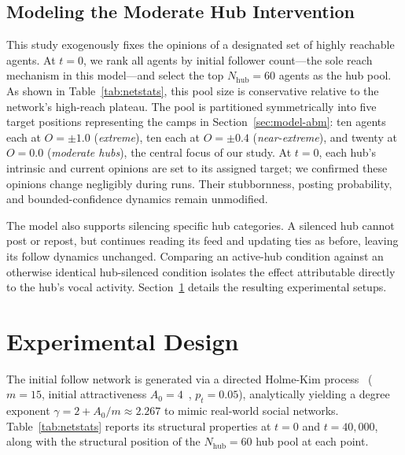 \documentclass{svproc}
\begin{document}
\subsection{Modeling the Moderate Hub Intervention}\label{sec:model-intervention}
This study exogenously fixes the opinions of a designated set of
highly reachable agents. At $t=0$, we rank all agents by initial
follower count—the sole reach mechanism in this model—and select the
top $N_{\mathrm{hub}}=60$ agents as the hub pool. As shown in
Table~\ref{tab:netstats}, this pool size is conservative relative to
the network's high-reach plateau. The pool is partitioned
symmetrically into five target positions representing the camps in
Section~\ref{sec:model-abm}: ten agents each at $O=\pm1.0$
(\emph{extreme}), ten each at $O=\pm0.4$ (\emph{near-extreme}), and
twenty at $O=0.0$ (\emph{moderate hubs}), the central focus of our
study. At $t=0$, each hub's intrinsic and current opinions are set to
its assigned target; we confirmed these opinions change negligibly
during runs. Their stubbornness, posting probability, and
bounded-confidence dynamics remain unmodified.
\par

The model also supports silencing specific hub categories. A silenced
hub cannot post or repost, but continues reading its feed and updating
ties as before, leaving its follow dynamics unchanged. Comparing an
active-hub condition against an otherwise identical hub-silenced
condition isolates the effect attributable directly to the hub's vocal
activity. Section~\ref{sec:experiments} details the resulting
experimental setups.
\par


\section{Experimental Design}\label{sec:experiments}
The initial follow network is generated via a directed Holme-Kim
process~\cite{holme2002} ($m=15$, initial attractiveness
$A_0=4$~\cite{dorogovtsev2000}, $p_t=0.05$), analytically yielding a
degree exponent $\gamma=2+A_0/m\approx2.267$ to mimic real-world
social networks. Table~\ref{tab:netstats} reports its structural
properties at $t=0$ and $t=40{,}000$, along with the structural
position of the $N_{\mathrm{hub}}=60$ hub pool at each point.
\par
\end{document}
